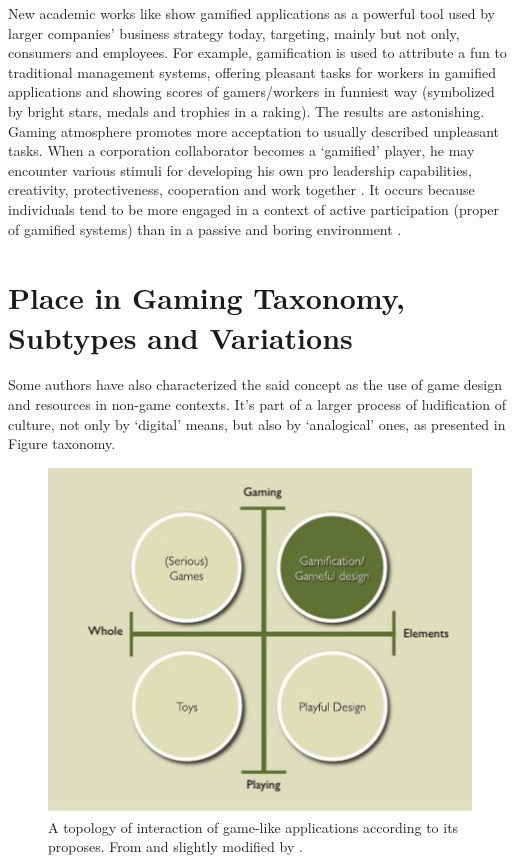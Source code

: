 New academic works like \citep{Gartner} show gamified applications as a powerful tool used by larger companies' business strategy today, targeting, mainly but not only, consumers and employees. For example, gamification is used to attribute a fun to traditional management systems, offering pleasant tasks for workers in gamified applications and showing scores of gamers/workers in funniest way (symbolized by bright stars, medals and trophies in a raking). The results are astonishing. Gaming atmosphere promotes more acceptation to usually described unpleasant tasks. When a corporation collaborator becomes a `gamified' player, he may encounter various stimuli for developing his own pro leadership capabilities, creativity, protectiveness, cooperation and work together \citep{Zich}. It occurs because individuals tend to be more engaged in a context of active participation (proper of gamified systems) than in a passive and boring environment \citep{Medina}.

\section{Place in Gaming Taxonomy, Subtypes and Variations}
Some authors \citep{gameAcm} have also characterized the said concept as the use of game design and resources in non-game contexts. It's part of a larger process of ludification of culture, not only by `digital' means, but also by `analogical' ones, as presented in Figure \figurename{taxonomy}.
	

\begin{figure}[h]
	\begin{center}
		\includegraphics[width=14cm]{chapters/gamification/img/gamification.jpg}
		\caption{A topology of interaction of game-like applications according to its proposes. From \citep{gameAcm} and slightly modified by \cite{gamification_image}.}
		\label{taxonomy}
	\end{center}
\end{figure}



